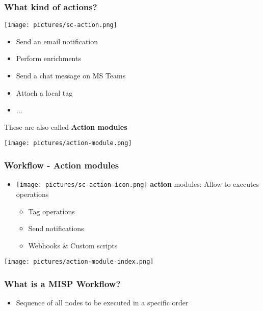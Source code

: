 \begin{frame}
    \frametitle{What kind of actions?}
    \vspace*{0.25em}
    \texttt{[image: pictures/sc-action.png]}
    \vspace*{0.25em}
    \begin{itemize}
        \item Send an email notification
        \item Perform enrichments
        \item Send a chat message on MS Teams
        \item Attach a local tag
        \item ...
    \end{itemize}

    \vspace*{0.5em}
    {\Large {}} These are also called \textbf{Action modules}
    \begin{center}
        \texttt{[image: pictures/action-module.png]}
    \end{center}
\end{frame}

\begin{frame}
    \frametitle{Workflow - Action modules}
    \begin{itemize}
        \item \texttt{[image: pictures/sc-action-icon.png]} \textbf{action} modules: Allow to executes operations
        \begin{itemize}
            \item Tag operations
            \item Send notifications
            \item Webhooks \& Custom scripts
        \end{itemize}
    \end{itemize}
    \begin{center}
        \texttt{[image: pictures/action-module-index.png]}
    \end{center}
\end{frame}

\begin{frame}
    \frametitle{What is a MISP Workflow?}
    \begin{itemize}
        \item Sequence of all nodes to be executed in a specific order
    \end{itemize}
    \vspace*{0.5em}
    \begin{center}
    \end{center}
\end{frame}

